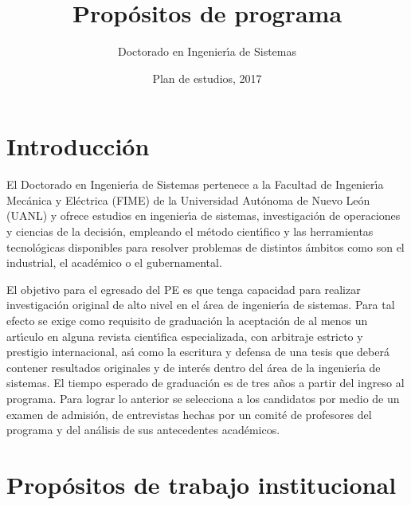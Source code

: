 \documentclass{article}
\title{Prop\'{o}sitos de programa}
\author{Doctorado en Ingenier\'{\i}a de Sistemas}
\date{Plan de estudios, 2017}
\begin{document}
\maketitle

\section{Introducci\'{o}n}

El Doctorado en Ingenier\'{\i}a de Sistemas pertenece a la Facultad de
Ingenier\'{\i}a Mec\'{a}nica y El\'{e}ctrica (FIME) de la Universidad Aut\'{o}noma de
Nuevo Le\'{o}n (UANL) y ofrece estudios en ingenier\'{\i}a de sistemas,
investigaci\'{o}n de operaciones y ciencias de la decisi\'{o}n, empleando el
m\'{e}todo cient\'{\i}fico y las herramientas tecnol\'{o}gicas disponibles para
resolver problemas de distintos \'{a}mbitos como son el industrial, el
acad\'{e}mico o el gubernamental.

El objetivo para el egresado del PE es que tenga capacidad para
realizar investigaci\'{o}n original de alto nivel en el \'{a}rea de ingenier\'{\i}a
de sistemas. Para tal efecto se exige como requisito de graduaci\'{o}n la
aceptaci\'{o}n de al menos un art\'{\i}culo en alguna revista cient\'{\i}fica
especializada, con arbitraje estricto y prestigio internacional, as\'{\i}
como la escritura y defensa de una tesis que deber\'{a} contener
resultados originales y de inter\'{e}s dentro del \'{a}rea de la ingenier\'{\i}a de
sistemas. El tiempo esperado de graduaci\'{o}n es de tres a\~{n}os a partir
del ingreso al programa. Para lograr lo anterior se selecciona a los
candidatos por medio de un examen de admisi\'{o}n, de entrevistas hechas
por un comit\'{e} de profesores del programa y del an\'{a}lisis de sus
antecedentes acad\'{e}micos.

\section{Prop\'{o}sitos de trabajo institucional}
\end{document}
